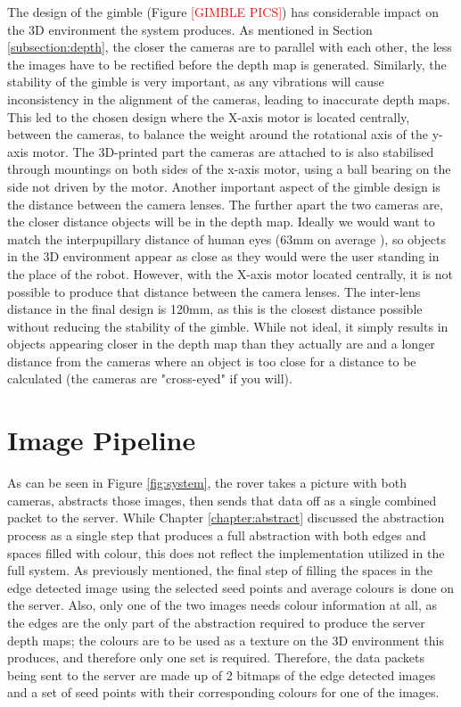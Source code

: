 The design of the gimble (Figure \textcolor{red}{[GIMBLE PICS]}) has considerable impact on the 3D environment the system produces. As mentioned in Section \ref{subsection:depth}, the closer the cameras are to parallel with each other, the less the images have to be rectified before the depth map is generated. Similarly, the stability of the gimble is very important, as any vibrations will cause inconsistency in the alignment of the cameras, leading to inaccurate depth maps. This led to the chosen design where the X-axis motor is located centrally, between the cameras, to balance the weight around the rotational axis of the y-axis motor. The 3D-printed part the cameras are attached to is also stabilised through mountings on both sides of the x-axis motor, using a ball bearing on the side not driven by the motor. Another important aspect of the gimble design is the distance between the camera lenses. The further apart the two cameras are, the closer distance objects will be in the depth map. Ideally we would want to match the interpupillary distance of human eyes (63mm on average \cite{dodgson2004variation}), so objects in the 3D environment appear as close as they would were the user standing in the place of the robot. However, with the X-axis motor located centrally, it is not possible to produce that distance between the camera lenses. The inter-lens distance in the final design is 120mm, as this is the closest distance possible without reducing the stability of the gimble. While not ideal, it simply results in objects appearing closer in the depth map than they actually are and a longer distance from the cameras where an object is too close for a distance to be calculated (the cameras are "cross-eyed" if you will).

\section{Image Pipeline}
\label{Subsection:comms}

As can be seen in Figure \ref{fig:system}, the rover takes a picture with both cameras, abstracts those images, then sends that data off as a single combined packet to the server. While Chapter \ref{chapter:abstract} discussed the abstraction process as a single step that produces a full abstraction with both edges and spaces filled with colour, this does not reflect the implementation utilized in the full system. As previously mentioned, the final step of filling the spaces in the edge detected image using the selected seed points and average colours is done on the server. Also, only one of the two images needs colour information at all, as the edges are the only part of the abstraction required to produce the server depth maps; the colours are to be used as a texture on the 3D environment this produces, and therefore only one set is required. Therefore, the data packets being sent to the server are made up of 2 bitmaps of the edge detected images and a set of seed points with their corresponding colours for one of the images.

